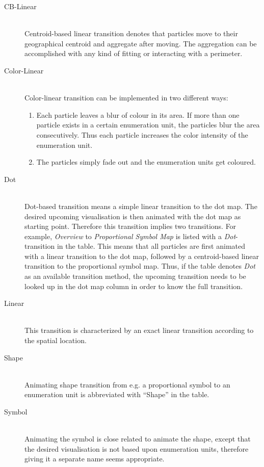 \begin{description}

\item[CB-Linear] \hfill \\
Centroid-based linear transition denotes that particles move to their geographical centroid and aggregate after moving. The aggregation can be accomplished with any kind of fitting or interacting with a perimeter.

\item[Color-Linear] \hfill \\
Color-linear transition can be implemented in two different ways:
\begin{enumerate}
\item Each particle leaves a blur of colour in its area. If more than one particle exists in a certain enumeration unit, the particles blur the area consecutively. Thus each particle increases the color intensity of the enumeration unit.
\item The particles simply fade out and the enumeration units get coloured.
\end{enumerate}

\item[Dot] \hfill \\
Dot-based transition means a simple linear transition to the dot map. The desired upcoming visualisation is then animated with the dot map as starting point. Therefore this transition implies two transitions. For example, \textit{Overview} to \textit{Proportional Symbol Map} is listed with a \textit{Dot}-transition in the table. This means that all particles are first animated with a linear transition to the dot map, followed by a centroid-based linear transition to the proportional symbol map. Thus, if the table denotes \textit{Dot} as an available transition method, the upcoming transition needs to be looked up in the dot map column in order to know the full transition.

\item[Linear] \hfill \\
This transition is characterized by an exact linear transition according to the spatial location.

\item[Shape] \hfill \\
Animating shape transition from e.g. a proportional symbol to an enumeration unit is abbreviated with ``Shape'' in the table.

\item[Symbol] \hfill \\
Animating the symbol is close related to animate the shape, except that the desired visualisation is not based upon enumeration units, therefore giving it a separate name seems appropriate.

\end{description}

